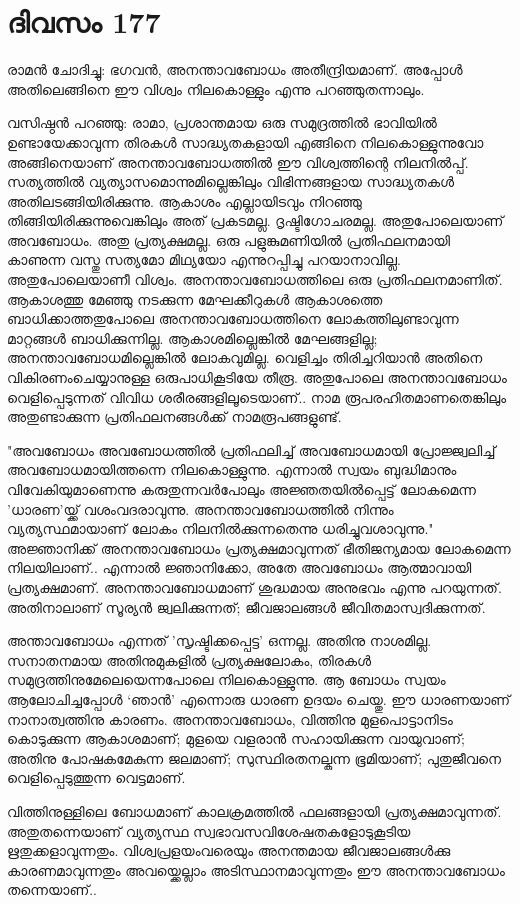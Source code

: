\section{ദിവസം 177}


രാമൻ ചോദിച്ചു: ഭഗവൻ, അനന്താവബോധം അതീന്ദ്രിയമാണ്‌. അപ്പോൾ അതിലെങ്ങിനെ ഈ വിശ്വം നിലകൊള്ളും എന്നു പറഞ്ഞുതന്നാലും.

വസിഷ്ഠൻ പറഞ്ഞു: രാമാ, പ്രശാന്തമായ ഒരു സമുദ്രത്തിൽ ഭാവിയിൽ ഉണ്ടായേക്കാവുന്ന തിരകൾ സാദ്ധ്യതകളായി എങ്ങിനെ നിലകൊള്ളുന്നുവോ അങ്ങിനെയാണ്‌ അനന്താവബോധത്തിൽ ഈ വിശ്വത്തിന്റെ നിലനിൽപ്പ്. സത്യത്തിൽ വ്യത്യാസമൊന്നുമില്ലെങ്കിലും വിഭിന്നങ്ങളായ സാദ്ധ്യതകള്‍ അതിലടങ്ങിയിരിക്കുന്നു. ആകാശം എല്ലായിടവും നിറഞ്ഞു തിങ്ങിയിരിക്കുന്നുവെങ്കിലും അത് പ്രകടമല്ല. ദൃഷ്ടിഗോചരമല്ല. അതുപോലെയാണ്‌ അവബോധം. അതു പ്രത്യക്ഷമല്ല. ഒരു പളുങ്കുമണിയിൽ പ്രതിഫലനമായി കാണുന്ന വസ്തു സത്യമോ മിഥ്യയോ എന്നുറപ്പിച്ചു പറയാനാവില്ല. അതുപോലെയാണീ വിശ്വം. അനന്താവബോധത്തിലെ ഒരു പ്രതിഫലനമാണിത്. ആകാശത്തു മേഞ്ഞു നടക്കുന്ന മേഘക്കീറുകൾ ആകാശത്തെ ബാധിക്കാത്തതുപോലെ അനന്താവബോധത്തിനെ ലോകത്തിലുണ്ടാവുന്ന മാറ്റങ്ങൾ ബാധിക്കുന്നില്ല. ആകാശമില്ലെങ്കിൽ മേഘങ്ങളില്ല; അനന്താവബോധമില്ലെങ്കിൽ ലോകവുമില്ല. വെളിച്ചം തിരിച്ചറിയാൻ അതിനെ വികിരണംചെയ്യാനുള്ള ഒരുപാധികൂടിയേ തീരൂ. അതുപോലെ അനന്താവബോധം വെളിപ്പെടുന്നത് വിവിധ ശരീരങ്ങളിലൂടെയാണ്‌.. നാമ രൂപരഹിതമാണതെങ്കിലും അതുണ്ടാക്കുന്ന പ്രതിഫലനങ്ങൾക്ക് നാമരൂപങ്ങളുണ്ട്.

"അവബോധം അവബോധത്തിൽ പ്രതിഫലിച്ച് അവബോധമായി പ്രോജ്ജ്വലിച്ച് അവബോധമായിത്തന്നെ നിലകൊള്ളുന്നു. എന്നാൽ സ്വയം ബുദ്ധിമാനും വിവേകിയുമാണെന്നു കരുതുന്നവർപോലും അജ്ഞതയില്‍പ്പെട്ട് ലോകമെന്ന 'ധാരണ'യ്ക്ക് വശംവദരാവുന്നു. അനന്താവബോധത്തിൽ നിന്നും വ്യത്യസ്ഥമായാണ്‌ ലോകം നിലനില്‍ക്കുന്നതെന്നു ധരിച്ചുവശാവുന്നു." അജ്ഞാനിക്ക് അനന്താവബോധം പ്രത്യക്ഷമാവുന്നത് ഭീതിജന്യമായ ലോകമെന്ന നിലയിലാണ്‌.. എന്നാൽ ജ്ഞാനിക്കോ, അതേ അവബോധം ആത്മാവായി പ്രത്യക്ഷമാണ്. അനന്താവബോധമാണ്‌ ശുദ്ധമായ അനുഭവം എന്നു പറയുന്നത്. അതിനാലാണ്‌ സൂര്യൻ ജ്വലിക്കുന്നത്; ജീവജാലങ്ങൾ ജീവിതമാസ്വദിക്കുന്നത്.

അന്താവബോധം എന്നത് 'സൃഷ്ടിക്കപ്പെട്ട' ഒന്നല്ല. അതിനു നാശമില്ല. സനാതനമായ അതിനുമുകളിൽ പ്രത്യക്ഷലോകം, തിരകൾ സമുദ്രത്തിനുമേലെയെന്നപോലെ നിലകൊള്ളുന്നു. ആ ബോധം സ്വയം ആലോചിച്ചപ്പോൾ ‘ഞാൻ’ എന്നൊരു ധാരണ ഉദയം ചെയ്തു. ഈ ധാരണയാണ്‌ നാനാത്വത്തിനു കാരണം. അനന്താവബോധം, വിത്തിനു മുളപൊട്ടാനിടം കൊടുക്കുന്ന ആകാശമാണ്‌; മുളയെ വളരാൻ സഹായിക്കുന്ന വായുവാണ്‌; അതിനു പോഷകമേകുന്ന ജലമാണ്‌; സുസ്ഥിരതനല്കുന്ന ഭൂമിയാണ്‌; പുതുജീവനെ വെളിപ്പെടുത്തുന്ന വെട്ടമാണ്‌.

വിത്തിനുള്ളിലെ ബോധമാണ്‌ കാലക്രമത്തിൽ ഫലങ്ങളായി പ്രത്യക്ഷമാവുന്നത്. അതുതന്നെയാണ്‌ വ്യത്യസ്ഥ സ്വഭാവസവിശേഷതകളോടുകൂടിയ ഋതുക്കളാവുന്നതും. വിശ്വപ്രളയംവരെയും അനന്തമായ ജീവജാലങ്ങൾക്കു കാരണമാവുന്നതും അവയ്ക്കെല്ലാം അടിസ്ഥാനമാവുന്നതും ഈ അനന്താവബോധം തന്നെയാണ്‌..

